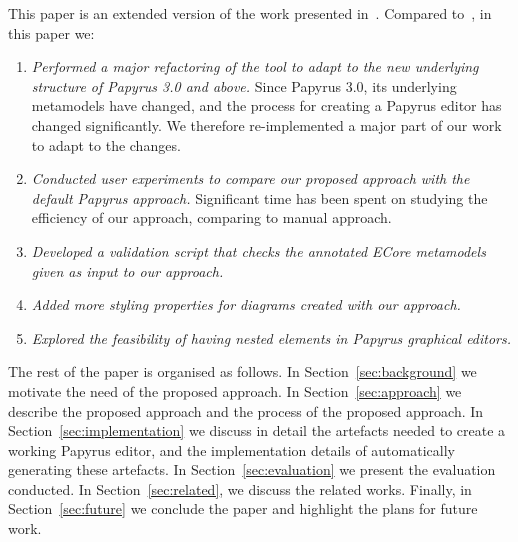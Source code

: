 This paper is an extended version of the work presented in~\cite{zolotas2018towards}. Compared to~\cite{zolotas2018towards}, in this paper we:
\begin{enumerate}
	\item \textit{Performed a major refactoring of the tool to adapt to the new underlying structure of Papyrus 3.0 and above.}
	Since Papyrus 3.0, its underlying metamodels have changed, and the process for creating a Papyrus editor has changed significantly. 
	We therefore re-implemented a major part of our work to adapt to the changes.
	\item \textit{Conducted user experiments to compare our proposed approach with the default Papyrus approach.}
	Significant time has been spent on studying the efficiency of our approach, comparing to manual approach.
	\item \textit{Developed a validation script that checks the annotated ECore metamodels given as input to our approach.}
	\item \textit{Added more styling properties for diagrams created with our approach.}
	\item \textit{Explored the feasibility of having nested elements in Papyrus graphical editors.} 
\end{enumerate}
The rest of the paper is organised as follows. 
In Section~\ref{sec:background} we motivate the need of the proposed approach. 
In Section~\ref{sec:approach} we describe the proposed approach and the process of the proposed approach. 
In Section~\ref{sec:implementation} we discuss in detail the artefacts needed to create a working Papyrus editor, and the implementation details of automatically generating these artefacts. 
In Section~\ref{sec:evaluation} we present the evaluation conducted.
In Section~\ref{sec:related}, we discuss the related works. 
Finally, in Section~\ref{sec:future} we conclude the paper and highlight the plans for future work.